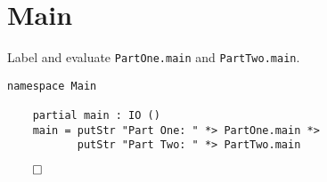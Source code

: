 \newpage

\section{Main}\label{main}

Label and evaluate \texttt{PartOne.main} and
\texttt{PartTwo.main}.

\begin{verbatim}
namespace Main

    partial main : IO ()
    main = putStr "Part One: " *> PartOne.main *>
           putStr "Part Two: " *> PartTwo.main
\end{verbatim}

\(\qed\)
